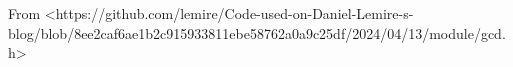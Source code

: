 From <https://github.com/lemire/Code-used-on-Daniel-Lemire-s-blog/blob/8ee2caf6ae1b2c915933811ebe58762a0a9c25df/2024/04/13/module/gcd.h>
